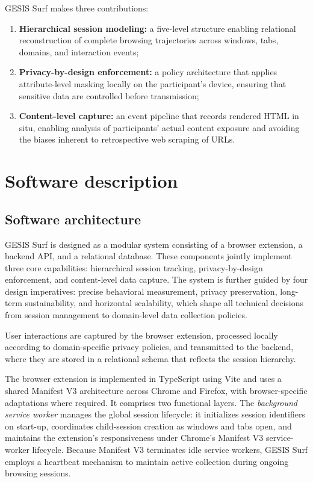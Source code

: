 \documentclass[preprint,12pt,a4paper]{elsarticle}
\begin{document}
GESIS Surf makes three contributions:
\begin{enumerate}
    \item \textbf{Hierarchical session modeling:} a five-level structure enabling relational reconstruction of complete browsing trajectories across windows, tabs, domains, and interaction events;
    \item \textbf{Privacy-by-design enforcement:} a policy architecture that applies attribute-level masking locally on the participant's device, ensuring that sensitive data are controlled before transmission;
    \item \textbf{Content-level capture:} an event pipeline that records rendered HTML in situ, enabling analysis of participants' actual content exposure and avoiding the biases inherent to retrospective web scraping of URLs.
\end{enumerate}

  \section{Software description}

  \subsection{Software architecture}

GESIS Surf is designed as a modular system consisting of a browser extension, a backend API, and a relational database. These components jointly implement three core capabilities: hierarchical session tracking, privacy-by-design enforcement, and content-level data capture. The system is further guided by four design imperatives: precise behavioral measurement, privacy preservation, long-term sustainability, and horizontal scalability, which shape all technical decisions from session management to domain-level data collection policies.

User interactions are captured by the browser extension, processed locally according to domain-specific privacy policies, and transmitted to the backend, where they are stored in a relational schema that reflects the session hierarchy.

The browser extension is implemented in TypeScript using Vite and uses a shared Manifest V3 architecture across Chrome and Firefox, with browser-specific adaptations where required. It comprises two functional layers. The \emph{background service worker} manages the global session lifecycle: it initializes session identifiers on start-up, coordinates child-session creation as windows and tabs open, and maintains the extension's responsiveness under Chrome's Manifest V3 service-worker lifecycle. Because Manifest V3 terminates idle service workers, GESIS Surf employs a heartbeat mechanism to maintain active collection during ongoing browsing sessions.
\end{document}
